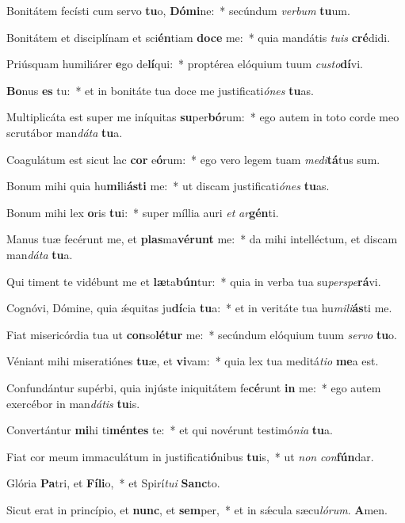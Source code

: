 ﻿\item Bonitátem fecísti cum servo \textbf{tu}o, \textbf{Dó}\textbf{mi}ne:~* secúndum \emph{ver}\emph{bum} \textbf{tu}um.
\item Bonitátem et disciplínam et sci\textbf{én}tiam \textbf{do}\textbf{ce} me:~* quia mandátis \emph{tu}\emph{is} \textbf{cré}didi.
\item Priúsquam humiliárer \textbf{e}go de\textbf{lí}qui:~* proptérea elóquium tuum \emph{cus}\emph{to}\textbf{dí}vi.
\item \textbf{Bo}nus \textbf{es} tu:~* et in bonitáte tua doce me justificati\emph{ó}\emph{nes} \textbf{tu}as.
\item Multiplicáta est super me iníquitas \textbf{su}per\textbf{bó}rum:~* ego autem in toto corde meo scrutábor man\emph{dá}\emph{ta} \textbf{tu}a.
\item Coagulátum est sicut lac \textbf{cor} e\textbf{ó}rum:~* ego vero legem tuam \emph{me}\emph{di}\textbf{tá}tus sum.
\item Bonum mihi quia hu\textbf{mi}li\textbf{ás}\textbf{ti} me:~* ut discam justificati\emph{ó}\emph{nes} \textbf{tu}as.
\item Bonum mihi lex \textbf{o}ris \textbf{tu}i:~* super míllia auri \emph{et} \emph{ar}\textbf{gén}ti.
\item Manus tuæ fecérunt me, et \textbf{plas}ma\textbf{vé}\textbf{runt} me:~* da mihi intelléctum, et discam man\emph{dá}\emph{ta} \textbf{tu}a.
\item Qui timent te vidébunt me et \textbf{læ}ta\textbf{bún}tur:~* quia in verba tua su\emph{per}\emph{spe}\textbf{rá}vi.
\item Cognóvi, Dómine, quia ǽquitas ju\textbf{dí}cia \textbf{tu}a:~* et in veritáte tua hu\emph{mi}\emph{li}\textbf{ás}ti me.
\item Fiat misericórdia tua ut \textbf{con}so\textbf{lé}\textbf{tur} me:~* secúndum elóquium tuum \emph{ser}\emph{vo} \textbf{tu}o.
\item Véniant mihi miseratiónes \textbf{tu}æ, et \textbf{vi}vam:~* quia lex tua meditá\emph{ti}\emph{o} \textbf{me}a est.
\item Confundántur supérbi, quia injúste iniquitátem fe\textbf{cé}runt \textbf{in} me:~* ego autem exercébor in man\emph{dá}\emph{tis} \textbf{tu}is.
\item Convertántur \textbf{mi}hi ti\textbf{mén}\textbf{tes} te:~* et qui novérunt testimó\emph{ni}\emph{a} \textbf{tu}a.
\item Fiat cor meum immaculátum in justificati\textbf{ó}nibus \textbf{tu}is,~* ut \emph{non} \emph{con}\textbf{fún}dar.
\item Glória \textbf{Pa}tri, et \textbf{Fí}\textbf{li}o,~* et Spirí\emph{tu}\emph{i} \textbf{Sanc}to.
\item Sicut erat in princípio, et \textbf{nunc}, et \textbf{sem}per,~* et in sǽcula sæcu\emph{ló}\emph{rum}. \textbf{A}men.
